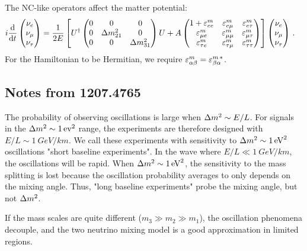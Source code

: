 \documentclass[twocolumn]{article}
\begin{document}
The NC-like operators affect the matter potential:
\begin{align*}
  i \dv{}{t} \begin{pmatrix} 
                \ne \\ \nm \\ \nt
             \end{pmatrix}
  &= \frac{1}{2E} 
  \left[ 
    U^\dagger \begin{pmatrix} 
                0 & 0 & 0 \\
                0 & \dm[21] & 0 \\
                0 & 0 & \dm[31]
              \end{pmatrix} 
  U + A
    \begin{pmatrix} 
      1 + \varepsilon_{ee}^m & \varepsilon_{e\mu}^m & \varepsilon_{e\tau}^m   \\
     \varepsilon_{\mu e}^m   &\varepsilon_{\mu \mu}^m   &\varepsilon_{\mu \tau}^m   \\
     \varepsilon_{\tau e}^m   &\varepsilon_{\tau \mu}^m   &\varepsilon_{\tau \tau}^m  
    \end{pmatrix}
  \right]
  \begin{pmatrix} 
    \ne \\ \nm \\ \nt
  \end{pmatrix}
\,.\end{align*}
For the Hamiltonian to be Hermitian, we require $\varepsilon_{\alpha\beta}^m = \varepsilon_{\beta\alpha}^{m\,*} $.

\subsection*{Notes from 1207.4765}

The probability of observing oscillations is large when $\dm \sim E/L$. For signals in the $\dm \sim \SI{1}{ev^2}$ range, the experiments are therefore designed with $E/L \sim \SI{1}{GeV/km}$. We call these experiments with sensitivity to $\dm \sim \SI{1}{eV^2}$ oscillations "short baseline experiments". In the wave where $E/L \ll \SI{1}{GeV/km}$, the oscillations will be rapid. When $\dm \sim \SI{1}{eV^2}$, the sensitivity to the mass splitting is lost because the oscillation probability averages to only depends on the mixing angle. Thus, "long baseline experiments" probe the mixing angle, but not $\dm$.

If the mass scales are quite different ($m_3 \gg m_2 \gg m_1$), the oscillation phenomena decouple, and the two neutrino mixing model is a good approximation in limited regions. 
\end{document}
